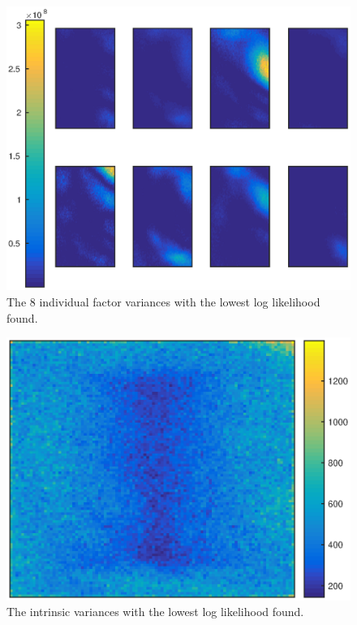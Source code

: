 \documentclass[12pt]{report}
\begin{document}
\begin{figure}
	\centering
	\includegraphics[width=\textwidth]{figures/initial_factor_factorNoise.eps}
	\caption{The 8 individual factor variances with the lowest log likelihood found.}
	\label{fig:initial_factor_factorNoise}
\end{figure}

\begin{figure}
	\centering
	\includegraphics[width=\textwidth]{figures/initial_factor_instrinicNoise.eps}
	\caption{The intrinsic variances with the lowest log likelihood found.}
	\label{fig:initial_factor_instrinicNoise}
\end{figure}
\end{document}
